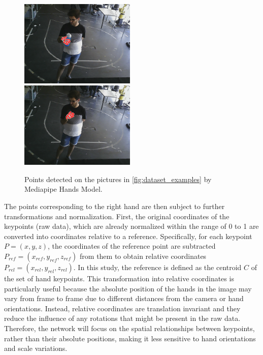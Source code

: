 \begin{figure}[ht]
    \centerline{\includegraphics[width=0.49\textwidth]{figs/dataset_preprocessing2_1.png} \ \includegraphics[width=0.49\textwidth]{figs/dataset_preprocessing2_2.png}}
    \caption{Points detected on the pictures in \autoref{fig:dataset_examples} by Mediapipe Hands Model.}
    \label{fig:dataset_examples2}
\end{figure}

The points corresponding to the right hand are then subject to further transformations and normalization. First, the original coordinates of the keypoints (raw data), which are already normalized within the range of 0 to 1 are converted into coordinates relative to a reference. Specifically, for each keypoint $P = (x,y,z)$, the coordinates of the reference point are subtracted $P_{ref} = (x_{ref}, y_{ref}, z_{ref})$ from them to obtain relative coordinates $P_{rel} = (x_{rel}, y_{rel}, z_{rel})$. In this study, the reference is defined as the centroid $C$ of the set of hand keypoints.
This transformation into relative coordinates is particularly useful because the absolute position of the hands in the image may vary from frame to frame due to different distances from the camera or hand orientations. Instead, relative coordinates are translation invariant and they reduce the influence of any rotations that might be present in the raw data. Therefore, the network will focus on the spatial relationships between keypoints, rather than their absolute positions, making it less sensitive to hand orientations and scale variations.

